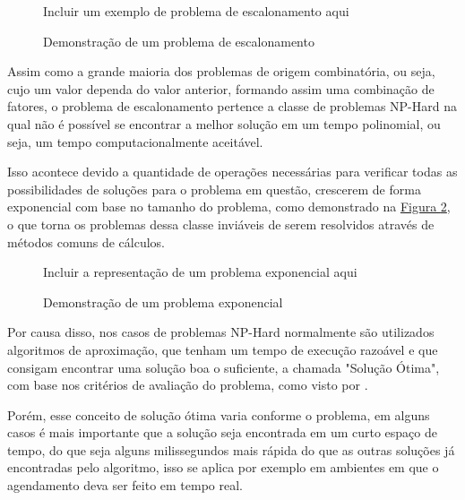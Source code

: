         \begin{figure}[ht]
            \centering
            \small{Incluir um exemplo de problema de escalonamento aqui}
            \caption{Demonstração de um problema de escalonamento}
            \label{fig:ex-problema-escalonamento}
        \end{figure}

        Assim como a grande maioria dos problemas de origem combinatória, ou seja, cujo um valor dependa do valor anterior, formando assim uma combinação de fatores, o problema de escalonamento pertence a classe de problemas NP-Hard na qual não é possível se encontrar a melhor solução em um tempo polinomial, ou seja, um tempo computacionalmente aceitável.\hfill\vspace{\onelineskip}

        Isso acontece devido a quantidade de operações necessárias para verificar todas as possibilidades de soluções para o problema em questão, crescerem de forma exponencial com base no tamanho do problema, 
        como demonstrado na \hyperref[fig:problema-exponencial]{Figura \ref{fig:problema-exponencial}},
        o que torna os problemas dessa classe inviáveis de serem resolvidos através de métodos comuns de cálculos.\hfill
        
        \begin{figure}[h]
            \centering
            \small{Incluir a representação de um problema exponencial aqui}
            \caption{Demonstração de um problema exponencial}
            \label{fig:problema-exponencial}
        \end{figure}
        

        Por causa disso, nos casos de problemas NP-Hard normalmente são utilizados algoritmos de aproximação, que tenham um tempo de execução razoável e que consigam encontrar uma solução boa o suficiente, a chamada "Solução Ótima",  com base nos critérios de avaliação do problema, como visto por \cite{lawler1993}.\hfill\vspace{\onelineskip}

        Porém, esse conceito de solução ótima varia conforme o problema, em alguns casos é mais importante que a solução seja encontrada em um curto espaço de tempo, do que seja alguns milissegundos mais rápida do que as outras soluções já encontradas pelo algoritmo, isso se aplica por exemplo em ambientes em que o agendamento deva ser feito em tempo real.\hfill\vspace{\onelineskip}
        
